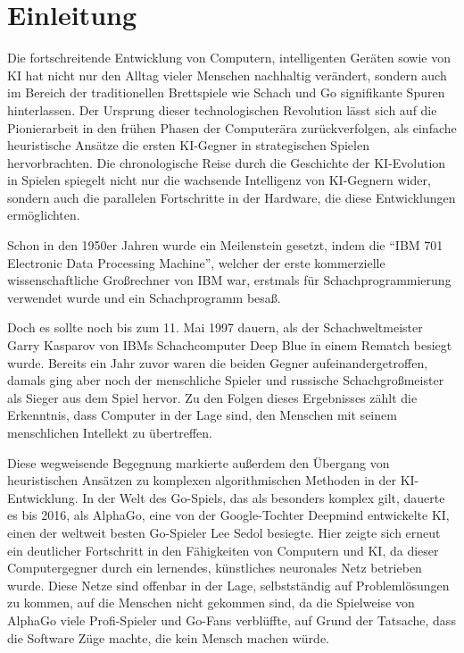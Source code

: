 \chapter{Einleitung}
\label{chapter:einleitung}

Die fortschreitende Entwicklung von Computern, intelligenten Geräten sowie von \ac{KI} hat nicht nur den Alltag vieler Menschen nachhaltig verändert, sondern auch im Bereich der traditionellen Brettspiele wie Schach und Go signifikante Spuren hinterlassen. Der Ursprung dieser technologischen Revolution lässt sich auf die Pionierarbeit in den frühen Phasen der Computerära zurückverfolgen, als einfache heuristische Ansätze die ersten \ac{KI}-Gegner in strategischen Spielen hervorbrachten. Die chronologische Reise durch die Geschichte der \ac{KI}-Evolution in Spielen spiegelt nicht nur die wachsende Intelligenz von \ac{KI}-Gegnern wider, sondern auch die parallelen Fortschritte in der Hardware, die diese Entwicklungen ermöglichten.

Schon in den 1950er Jahren wurde ein Meilenstein gesetzt, indem die \enquote{\acs{IBM} 701 Electronic Data Processing Machine}, welcher der erste kommerzielle wissenschaftliche Großrechner von \ac{IBM} war, erstmals für Schachprogrammierung verwendet wurde und ein Schachprogramm besaß.

Doch es sollte noch bis zum 11. Mai 1997 dauern, als der Schachweltmeister Garry Kasparov von \ac{IBM}s Schachcomputer Deep Blue in einem Rematch besiegt wurde. Bereits ein Jahr zuvor waren die beiden Gegner aufeinandergetroffen, damals ging aber noch der menschliche Spieler und russische Schachgroßmeister als Sieger aus dem Spiel hervor. Zu den Folgen dieses Ergebnisses zählt die Erkenntnis, dass Computer in der Lage sind, den Menschen mit seinem menschlichen Intellekt zu übertreffen.

Diese wegweisende Begegnung markierte außerdem den Übergang von heuristischen Ansätzen zu komplexen algorithmischen Methoden in der \ac{KI}-Entwicklung. In der Welt des Go-Spiels, das als besonders komplex gilt, dauerte es bis 2016, als AlphaGo, eine von der Google-Tochter Deepmind entwickelte \ac{KI}, einen der weltweit besten Go-Spieler Lee Sedol besiegte. Hier zeigte sich erneut ein deutlicher Fortschritt in den Fähigkeiten von Computern und \ac{KI}, da dieser Computergegner durch ein lernendes, künstliches neuronales Netz betrieben wurde. Diese Netze sind offenbar in der Lage, selbstständig auf Problemlösungen zu kommen, auf die Menschen nicht gekommen sind, da die Spielweise von AlphaGo viele Profi-Spieler und Go-Fans verblüffte, auf Grund der Tatsache, dass die Software Züge machte, die kein Mensch machen würde.

